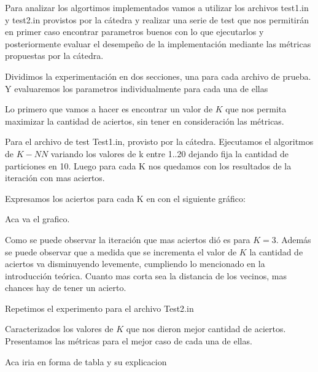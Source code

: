 Para analizar los algortimos implementados vamos a utilizar los archivos test1.in y test2.in provistos por la cátedra y realizar una serie de test que nos permitirán en primer caso encontrar parametros buenos con lo que ejecutarlos y posteriormente evaluar el desempeño de la implementación mediante las métricas propuestas por la cátedra.

Dividimos la experimentación en dos secciones, una para cada archivo de prueba. Y evaluaremos los parametros individualmente para cada una de ellas



Lo primero que vamos a hacer es encontrar un valor de $K$ que nos permita maximizar la cantidad de aciertos, sin tener en consideración las métricas.

Para el archivo de test Test1.in, provisto por la cátedra. Ejecutamos el algoritmos de $K-NN$ variando los valores de k entre {1..20} dejando fija la cantidad de particiones en 10. Luego para cada K nos quedamos con los resultados de la iteración con mas aciertos.

Expresamos los aciertos para cada K en con el siguiente gráfico:

Aca va el grafico.

Como se puede observar la iteración que mas aciertos dió es para $K = 3$. Además se puede observar que a medida que se incrementa el valor de $K$ la cantidad de aciertos va disminuyendo levemente, cumpliendo lo mencionado en la introducción teórica. Cuanto mas corta sea la distancia de los vecinos, mas chances hay de tener un acierto.

Repetimos el experimento para el archivo Test2.in

Caracterizados los valores de $K$ que nos dieron mejor cantidad de aciertos. Presentamos las métricas para el mejor caso de cada una de ellas.

Aca iria en forma de tabla y su explicacion






